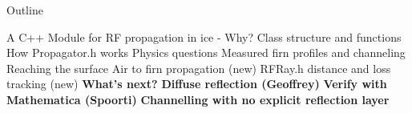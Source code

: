 \documentclass{beamer}
\begin{document}
\begin{frame}{Outline}
\begin{outline}[enumerate]
\1 A C++ Module for RF propagation in ice - Why?
\2 Class structure and functions
\2 How Propagator.h works
\1 Physics questions
\2 Measured firn profiles and channeling
\2 Reaching the surface
\2 Air to firn propagation (new)
\2 RFRay.h distance and loss tracking (new)
\1 \textbf{What's next?}
\2 \textbf{Diffuse reflection (Geoffrey)}
\2 \textbf{Verify with Mathematica (Spoorti)}
\2 \textbf{Channelling with no explicit reflection layer}
\end{outline}
\end{frame}
\end{document}
